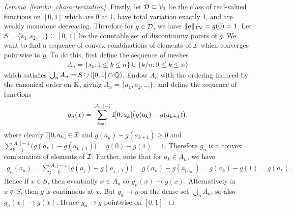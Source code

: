 \begin{proof}[Lemma~\ref{lem:bv_characterization}]

  Firstly, let $\mathcal{D} \subseteq \mathcal{V}_1$
  be the class of real-valued functions
  on $[0,1]$
  which are
  0 at 1,
  have total variation exactly 1,
  and are weakly monotone decreasing.
  Therefore for $g \in \mathcal{D}$,
  we have
  $\|g\|_{\mathrm{TV}} = g(0) = 1$.
  Let $S = \{s_1, s_2, \dots\} \subseteq [0,1]$
  be the countable set of discontinuity points of $g$.
  We want to find a sequence of
  convex combinations of elements of
  $\mathcal{I}$ which converges pointwise to $g$.
  To do this, first define the sequence of meshes
  \begin{align*}
    A_n =
    \{s_k : 1 \leq k \leq n\}
    \cup
    \{k/n : 0 \leq k \leq n\}
  \end{align*}
  which satisfies
  $\bigcup_n A_n = S \cup ([0,1] \cap \mathbb{Q})$.
  Endow $A_n$ with the ordering
  induced by the canonical order on $\mathbb{R}$,
  giving $A_n = \{a_1, a_2, \ldots\}$,
  and define the sequence of functions
  \begin{align*}
    g_n(x)
    = \sum_{k = 1}^{|A_n|-1}
    \mathbb{I}[0,a_k]
    \big( g(a_k) - g(a_{k+1}) \big),
  \end{align*}
  where clearly
  $\mathbb{I}[0, a_k] \in \mathcal{I}$
  and
  $g(a_k) - g(a_{k+1}) \geq 0$
  and
  $\sum_{k = 1}^{|A_n|-1}
  \big(
    g(a_k) - g(a_{k+1})
  \big)
  = g(0) - g(1) = 1$.
  Therefore
  $g_n$ is a convex combination of elements of
  $\mathcal{I}$.
  Further, note that for
  $a_k \in A_n$,
  we have
  \begin{align*}
    g_n(a_k)
    = \sum_{j = k}^{|A_n|-1}
    \big( g(a_j) - g(a_{j+1}) \big)
    = g(a_k) - g(a_{|A_n|})
    = g(a_k) - g(1)
    = g(a_k).
  \end{align*}
  Hence if $x \in S$,
  then eventually $x \in A_n$
  so $g_n(x) \to g(x)$.
  Alternatively in $x \not\in S$,
  then $g$ is continuous at $x$.
  But $g_n \to g$ on the dense set $\bigcup_n A_n$,
  so also $g_n(x) \to g(x)$.
  Hence $g_n \to g$
  pointwise on $[0,1]$.


\end{proof}
